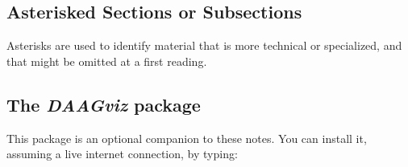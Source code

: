 \subsection*{Asterisked Sections or Subsections}

Asterisks are used to identify material that is more technical or
specialized, and that might be omitted at a first reading.

\subsection*{The {\em DAAGviz} package}
This package is an optional companion to these notes. 
You can install it, assuming a live internet connection,
by typing:
\begin{knitrout}
\color{fgcolor}\begin{kframe}
\begin{alltt}
\hlopt{::}\hlstd{(}\hlstd{)}
\end{alltt}
\end{kframe}
\end{knitrout}

